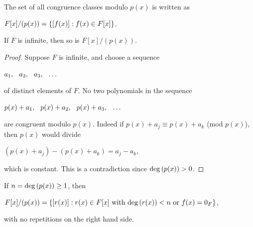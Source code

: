 \documentclass[11pt,fleqn,dvipsnames,usenames]{article}
\begin{document}
\notation The set of all congruence classes modulo $p(x)$ is written as
\begin{center}
$F[x]/(p(x)) = \left\{[f(x)]:f(x)\in F[x]\right\}$.
\end{center} 
\vsp

%
\begin{theorem}
If $F$ is infinite, then so is $F[x]/(p(x))$.
\end{theorem}
%
\begin{proof}
Suppose $F$ is infinite, and choose a sequence
\begin{center}
$a_{1},\hspace{0.25cm} a_{2},\hspace{0.25cm} a_{3},\hspace{0.25cm} \ldots$
\end{center}
of distinct elements of $F$.  No two polynomials in the sequence
\begin{center}
$p(x) + a_{1},\hspace{0.25cm} p(x) + a_{2},\hspace{0.25cm} p(x) + a_{3},\hspace{0.25cm} \ldots$
\end{center}
are congruent modulo $p(x)$.  Indeed if $p(x) + a_{j}\equiv p(x) + a_{k}$ (mod $p(x)$), then $p(x)$ would divide
\begin{center}
$(p(x) + a_{j}) - (p(x) + a_{k}) = a_{j} - a_{k}$,
\end{center}
which is constant.  This is a contradiction since $\text{deg}\left(p(x)\right)>0$.
\end{proof}
%
\begin{theorem}
If $n = \text{deg}\left(p(x)\right)\geq 1$, then
\begin{center}
$F[x]/(p(x)) = \left\{[r(x)]: r(x)\in F[x]\text{ with }\text{deg}\left(r(x)\right) < n\text{ or }f(x) = 0_{F}\right\}$,
\end{center}
with no repetitions on the right hand side.
\end{theorem}
%
\end{document}
